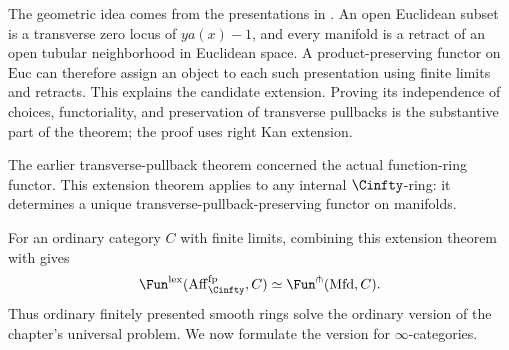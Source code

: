 The geometric idea comes from the presentations in
. An open Euclidean subset is a
transverse zero locus of $ya(x)-1$, and every manifold is a retract of
an open tubular neighborhood in Euclidean space. A product-preserving
functor on $\mathrm{Euc}$ can therefore assign an object to each such
presentation using finite limits and retracts. This explains the candidate
extension. Proving its independence of choices, functoriality, and
preservation of transverse pullbacks is the substantive part of the
theorem; the proof uses right Kan extension.

The earlier transverse-pullback theorem concerned the actual function-ring
functor. This extension theorem applies to any internal $\Cinfty$-ring:
it determines a unique transverse-pullback-preserving functor on manifolds.

For an ordinary category $C$ with finite limits, combining this extension
theorem with  gives
\[
  \Fun^{\mathrm{lex}}(\operatorname{Aff}_{\Cinfty}^{\mathrm{fp}},C)
  \simeq\Fun^\pitchfork(\mathrm{Mfd},C).
\]
Thus ordinary finitely presented smooth rings solve the ordinary version
of the chapter's universal problem. We now formulate the version for
$\infty$-categories.


